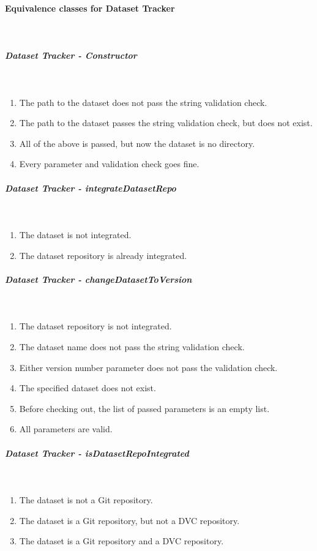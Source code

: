 \paragraph{Equivalence classes for Dataset Tracker} \mbox{}\\

\subparagraph{Dataset Tracker - Constructor} \mbox{}\\
\begin{enumerate}
    \item The path to the dataset does not pass the string validation check.
    \item The path to the dataset passes the string validation check, but does not exist.
    \item All of the above is passed, but now the dataset is no directory.
    \item Every parameter and validation check goes fine.
\end{enumerate}

\subparagraph{Dataset Tracker - integrateDatasetRepo} \mbox{}\\
\begin{enumerate}
    \item The dataset is not integrated.
    \item The dataset repository is already integrated.
\end{enumerate}

\subparagraph{Dataset Tracker - changeDatasetToVersion} \mbox{}\\
\begin{enumerate}
    \item The dataset repository is not integrated.
    \item The dataset name does not pass the string validation check.
    \item Either version number parameter does not pass the validation check.
    \item The specified dataset does not exist.
    \item Before checking out, the list of passed parameters is an empty list.
    \item All parameters are valid.
\end{enumerate}

\subparagraph{Dataset Tracker - isDatasetRepoIntegrated} \mbox{}\\
\begin{enumerate}
    \item The dataset is not a Git repository.
    \item The dataset is a Git repository, but not a DVC repository.
    \item The dataset is a Git repository and a DVC repository.
\end{enumerate}

